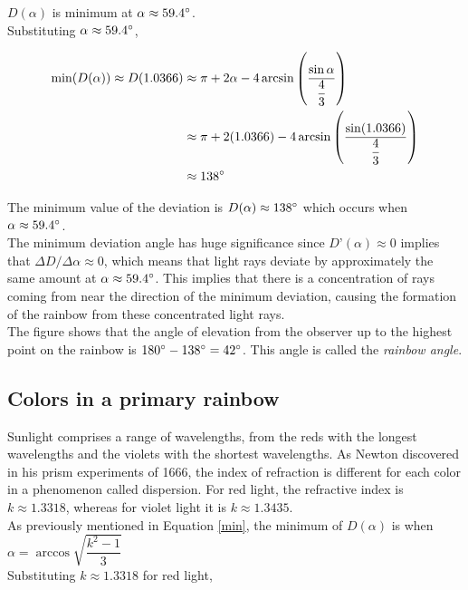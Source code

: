 \documentclass[a4paper,12pt]{article}
\begin{document}
$D(\alpha)$ is minimum at $\alpha \approx 59.4 \degree$.\\

Substituting $\alpha \approx  59.4 \degree$,

\begin{align*}
\min(D(\alpha)) \approx D(1.0366) &\approx \pi + 2\alpha - 4\arcsin \left( \frac{\sin \alpha}{\dfrac{4}{3}} \right)\\
&\approx \pi + 2(1.0366) -  4\arcsin \left( \frac{\sin (1.0366)}{\dfrac{4}{3}} \right)\\
&\approx 138 \degree
\end{align*}

The minimum value of the deviation is $D(\alpha) \approx 138 \degree$ which occurs when $\alpha \approx 59.4 \degree$.\\

The minimum deviation angle has huge significance since $D’(\alpha) \approx 0$ implies that $\Delta D/\Delta \alpha \approx 0$, which means that light rays deviate by approximately the same amount at $\alpha \approx 59.4 \degree$. This implies that there is a concentration of rays coming from near the direction of the minimum deviation, causing the formation of the rainbow from these concentrated light rays.\\

The figure shows that the angle of elevation from the observer up to the highest point on the rainbow is $180 \degree - 138 \degree = 42 \degree$. This angle is called the {\itshape rainbow angle}.

\subsection{Colors in a primary rainbow}

Sunlight comprises a range of wavelengths, from the reds with the longest wavelengths and the violets with the shortest wavelengths. As Newton discovered in his prism experiments of
1666, the index of refraction is different for each color in a phenomenon called dispersion.
For red light, the refractive index is $k \approx 1.3318$, whereas for violet light it is $k \approx 1.3435$.\\

As previously mentioned in Equation \ref{min}, the minimum of $D(\alpha)$ is when $\alpha = \arccos \sqrt{\dfrac{k^2 -1}{3}}$\\

Substituting $k \approx 1.3318$ for red light,
\end{document}
